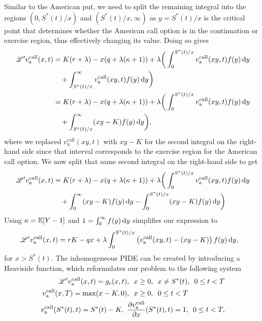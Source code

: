         Similar to the American put, we need to split the remaining integral into the regions $(0, S^*(t)/x)$ and $(S^*(t)/x,\infty)$ as $y = S^*(t)/x$ is the critical point that determines whether the American call option is in the continuation or exercise region, thus effectively changing its value. Doing so gives
        \begin{align*}
            \mathscr L'v_{\text{a}}^{\text{call}}(x,t) &= K(r+\lambda) - x(q+\lambda(\kappa+1)) + \lambda\bigg( \int_0^{S^*(t)/x} v_{\text{a}}^{\text{call}}(xy,t)f(y) \, \mathrm d y \\
            &{} \quad + \int_{S^*(t)/x}^\infty v_{\text{a}}^{\text{call}}(xy,t)f(y) \, \mathrm d y \bigg) \\
            &= K(r+\lambda) - x(q+\lambda(\kappa+1)) + \lambda\bigg( \int_0^{S^*(t)/x} v_{\text{a}}^{\text{call}}(xy,t)f(y) \, \mathrm d y \\
            &{} \quad+ \int_{S^*(t)/x}^\infty (xy - K)f(y) \, \mathrm d y \bigg),
        \end{align*}
    where we replaced $v_{\text{a}}^{\text{call}}(xy,t)$ with $xy-K$  for the second integral on the right-hand side since that interval corresponds to the exercise region for the American call option. We now split that same second integral on the right-hand side to get
        \begin{align*}
            \mathscr L'v_{\text{a}}^{\text{call}}(x,t) &= K(r+\lambda) - x(q+\lambda(\kappa+1)) + \lambda\bigg( \int_0^{S^*(t)/x} v_{\text{a}}^{\text{call}}(xy,t)f(y) \, \mathrm d y  \\
            &\quad + \int_{0}^\infty (xy-K)f(y) \, \mathrm d y - \int_0^{S^*(t)/x} (xy-K)f(y) \, \mathrm d y \bigg)
        \end{align*}
  Using $\kappa = \mathbb E[Y-1]$ and $1 = \int_0^\infty f(y) \, \mathrm d y$ simplifies our expression to
      \begin{align*}
          \mathscr L'v_{\text{a}}^{\text{call}}(x,t) &= rK - qx + \lambda \int_0^{S^*(t)/x} \left(v_{\text{a}}^{\text{call}}(xy,t) - (xy-K)\right)f(y) \,\mathrm d y,
      \end{align*}
    for $x > S^*(t)$. The inhomogeneous PIDE can be created by introducing a Heaviside function, which reformulates our problem to the following system
      \begin{align}
          \label{eqn:amerPIDEcall}
          \mathscr L'v_{\text{a}}^{\text{call}}(x,t) = g_c(x,t)&, \enskip x \geq 0, \enskip x \neq S^*(t), \enskip 0 \leq t < T \\
          \label{eqn:amerCall}
          v_{\text{a}}^{\text{call}}(x,T) =  \max(x - K,0) &, \enskip x \geq 0, \enskip 0 \leq t < T \\
          \label{eqn:amerPastingCall}
          v_{\text{a}}^{\text{call}}(S^*(t),t) = S^*(t) - K, \enskip &\frac{\partial v_{\text{a}}^{\text{call}}}{\partial x}(S^*(t),t) = 1, \enskip 0 \leq t < T,
      \end{align}
